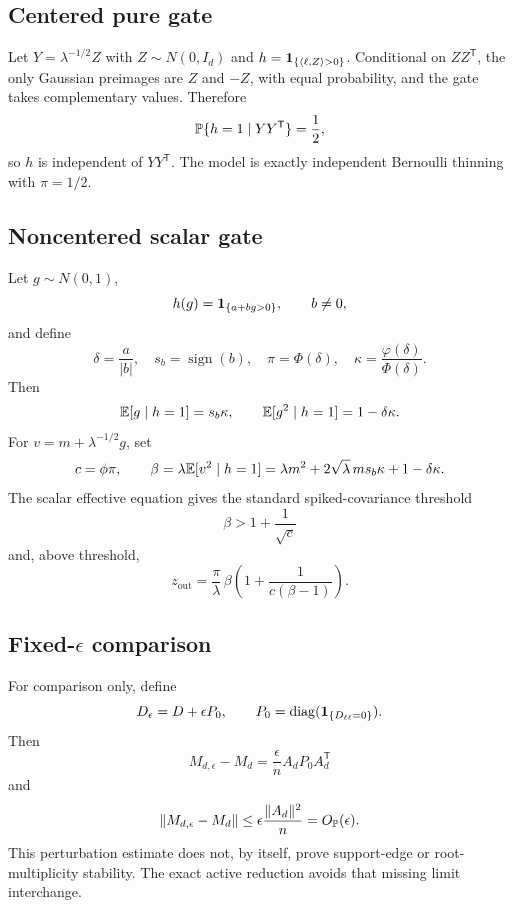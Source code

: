 \documentclass[
  aps,
  prl,
  10pt,
  onecolumn,
  longbibliography,
  nofootinbib
]{revtex4-2}
\theoremstyle{remark}
\begin{document}
\subsection{Centered pure gate}

Let $Y=\lambda^{-1/2}Z$ with $Z\sim N(0,I_d)$ and
$h=\mathbf{1}_{\{\langle\ell,Z\rangle>0\}}$. Conditional on $ZZ^{\mathsf T}$, the only Gaussian preimages are $Z$ and $-Z$, with equal probability, and the gate takes complementary values. Therefore
\begin{equation}
\mathbb{P}\{h=1\mid YY^{\mathsf T}\}=\frac12,
\end{equation}
so $h$ is independent of $YY^{\mathsf T}$. The model is exactly independent Bernoulli thinning with $\pi=1/2$.

\subsection{Noncentered scalar gate}

Let $g\sim N(0,1)$,
\begin{equation}
h(g)=\mathbf{1}_{\{a+bg>0\}},\qquad b\ne0,
\end{equation}
and define
\begin{equation}
\delta=\frac a{|b|},\quad s_b=\operatorname{sign}(b),\quad
\pi=\Phi(\delta),\quad
\kappa=\frac{\varphi(\delta)}{\Phi(\delta)}.
\end{equation}
Then
\begin{equation}
\mathbb{E}[g\mid h=1]=s_b\kappa,\qquad
\mathbb{E}[g^2\mid h=1]=1-\delta\kappa.
\end{equation}
For $v=m+\lambda^{-1/2}g$, set
\begin{equation}
c=\phi\pi,\qquad
\beta=\lambda\mathbb{E}[v^2\mid h=1]
=\lambda m^2+2\sqrt\lambda\,m s_b\kappa+1-\delta\kappa.
\end{equation}
The scalar effective equation gives the standard spiked-covariance threshold
\begin{equation}
\beta>1+\frac1{\sqrt c}
\end{equation}
and, above threshold,
\begin{equation}
z_{\mathrm{out}}
=
\frac{\pi}{\lambda}\,
\beta\left(1+\frac1{c(\beta-1)}\right).
\end{equation}

\subsection{Fixed-\texorpdfstring{$\epsilon$}{epsilon} comparison}

For comparison only, define
\begin{equation}
D_\epsilon=D+\epsilon P_0,\qquad
P_0=\operatorname{diag}(\mathbf{1}_{\{D_{\ell\ell}=0\}}).
\end{equation}
Then
\begin{equation}
M_{d,\epsilon}-M_d
=\frac{\epsilon}{n}A_dP_0A_d^{\mathsf T}
\end{equation}
and
\begin{equation}
\|M_{d,\epsilon}-M_d\|
\le\epsilon\frac{\|A_d\|^2}{n}
=O_{\mathbb{P}}(\epsilon).
\end{equation}
This perturbation estimate does not, by itself, prove support-edge or root-multiplicity stability. The exact active reduction avoids that missing limit interchange.
\end{document}
